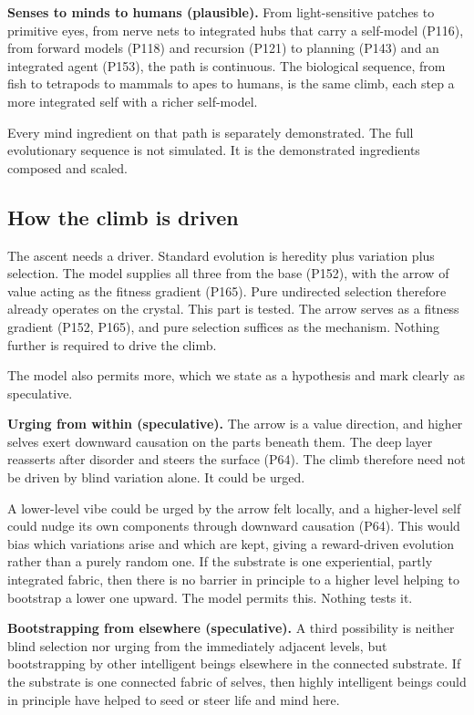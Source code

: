 \textbf{Senses to minds to humans (plausible).} From light-sensitive patches to primitive eyes, from nerve nets to integrated hubs that carry a self-model (P116), from forward models (P118) and recursion (P121) to planning (P143) and an integrated agent (P153), the path is continuous. The biological sequence, from fish to tetrapods to mammals to apes to humans, is the same climb, each step a more integrated self with a richer self-model.

Every mind ingredient on that path is separately demonstrated. The full evolutionary sequence is not simulated. It is the demonstrated ingredients composed and scaled.

\subsection{How the climb is driven}

The ascent needs a driver. Standard evolution is heredity plus variation plus selection. The model supplies all three from the base (P152), with the arrow of value acting as the fitness gradient (P165). Pure undirected selection therefore already operates on the crystal. This part is tested. The arrow serves as a fitness gradient (P152, P165), and pure selection suffices as the mechanism. Nothing further is required to drive the climb.

The model also permits more, which we state as a hypothesis and mark clearly as speculative.

\textbf{Urging from within (speculative).} The arrow is a value direction, and higher selves exert downward causation on the parts beneath them. The deep layer reasserts after disorder and steers the surface (P64). The climb therefore need not be driven by blind variation alone. It could be urged.

A lower-level vibe could be urged by the arrow felt locally, and a higher-level self could nudge its own components through downward causation (P64). This would bias which variations arise and which are kept, giving a reward-driven evolution rather than a purely random one. If the substrate is one experiential, partly integrated fabric, then there is no barrier in principle to a higher level helping to bootstrap a lower one upward. The model permits this. Nothing tests it.

\textbf{Bootstrapping from elsewhere (speculative).} A third possibility is neither blind selection nor urging from the immediately adjacent levels, but bootstrapping by other intelligent beings elsewhere in the connected substrate. If the substrate is one connected fabric of selves, then highly intelligent beings could in principle have helped to seed or steer life and mind here.


